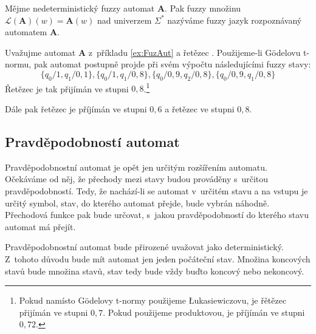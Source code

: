 \begin{definition}\label{def-JazRozpAut}
 Mějme nedeterministický fuzzy automat $\mathbf{A}$. Pak fuzzy množinu $\mathcal{L}(\mathbf{A})(w) = \mathbf{A}(w)$ nad univerzem $\Sigma^*$ nazýváme fuzzy jazyk rozpoznávaný automatem $\mathbf{A}$.
\end{definition}

\begin{example}
 Uvažujme automat $\mathbf{A}$ z~příkladu \ref{ex:FuzAut} a řetězec . Použijeme-li Gödelovu t-normu, pak automat postupně projde při svém výpočtu následujícími fuzzy stavy:
 $$
  \{ q_0 / 1, 		q_1 / 0{,}1 	 		\}, 
  \{ q_0 / 1, 		q_1 / 0{,}8 	 		\}, 
  \{ q_0 / 0{,}9, 		 	q_2 / 0{,}8 	\}, 
  \{ q_0 / 0{,}9, 	q_1 / 0{,}8 		 	\}
 $$
 Řetězec je tak přijímán ve stupni $0{,}8$.\footnote{Pokud namísto Gödelovy t-normy použijeme \L{}ukasiewiczovu, je řětězec přijímán ve stupni $0{,}7$. Pokud použijeme produktovou, je příjímán ve stupni $0{,}72$.}
 
 Dále pak řetězec  je příjímán ve stupni $0{,}6$ a řetězec  ve stupni $0{,}8$.
\end{example}


\subsection{Pravděpodobností automat}

Pravděpodobnostní automat je opět jen určitým rozšířením  automatu. Očekáváme od něj, že přechody mezi stavy budou prováděny s~určitou pravděpodobností. Tedy, že nachází-li se automat v~určitém stavu a na vstupu je určitý symbol, stav, do kterého automat přejde, bude vybrán náhodně. Přechodová funkce pak bude určovat, s~jakou pravděpodobností do kterého stavu automat má přejít.

Pravděpodobnostní automat bude přirozené uvažovat jako deterministický. Z~tohoto důvodu bude mít automat jen jeden počáteční stav. Množina koncových stavů bude  množina stavů, stav tedy bude vždy buďto koncový nebo nekoncový.

